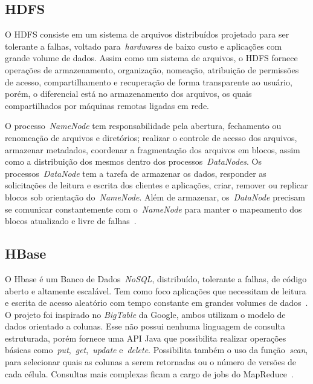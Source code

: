 \documentclass[12pt]{article}
\begin{document}
\subsection{HDFS}
\label{subsec:hdfs}

O HDFS consiste em um sistema de arquivos distribuídos projetado para ser tolerante a falhas, voltado para~\emph{hardwares} de baixo custo e aplicações com grande volume de dados. Assim como um sistema de arquivos, o HDFS fornece operações de armazenamento, organização, nomeação, atribuição de permissões de acesso, compartilhamento e recuperação de forma transparente ao usuário, porém, o diferencial está no armazenamento dos arquivos, os quais compartilhados por máquinas remotas ligadas em rede.

O processo~\emph{NameNode} tem responsabilidade pela abertura, fechamento ou renomeação de arquivos e diretórios; realizar o controle de acesso dos arquivos, armazenar metadados, coordenar a fragmentação dos arquivos em blocos, assim como a distribuição dos mesmos dentro dos processos~\emph{DataNodes}. Os processos~\emph{DataNode} tem a tarefa de armazenar os dados, responder as solicitações de leitura e escrita dos clientes e aplicações, criar, remover ou replicar blocos sob orientação do~\emph{NameNode}. Além de armazenar, os~\emph{DataNode} precisam se comunicar constantemente com o~\emph{NameNode} para manter o mapeamento dos blocos atualizado e livre de falhas~\cite{hadoophdfs}.

\subsection{HBase}
\label{subsec:hbase}

O Hbase é um Banco de Dados~\textit{NoSQL}, distribuído, tolerante a falhas, de código aberto e altamente escalável. Tem como foco aplicações que necessitam de leitura e escrita de acesso aleatório com tempo constante em grandes volumes de dados~\cite{hadoophbase}. O projeto foi inspirado no \textit{BigTable} da Google, ambos utilizam o modelo de dados orientado a colunas. Esse não possui nenhuma linguagem de consulta estruturada, porém fornece uma API Java que possibilita realizar operações básicas como~\emph{put},~\emph{get},~\emph{update} e~\emph{delete}. Possibilita também o uso da função~\emph{scan}, para selecionar quais as colunas a serem retornadas ou o número de versões de cada célula. Consultas mais complexas ficam a cargo de jobs do MapReduce~\cite{cunha2015column}.

\end{document}
